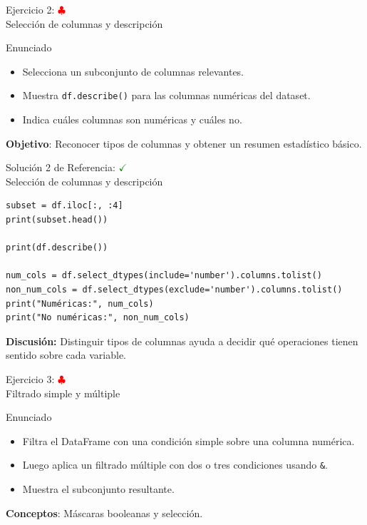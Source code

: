 \documentclass[10pt]{beamer}
\begin{document}
\begin{frame}{Ejercicio 2: \hfill \textcolor{red}{$\clubsuit$} \\ Selección de columnas y descripción}
  \begin{block}{Enunciado}
    \begin{itemize}
      \item Selecciona un subconjunto de columnas relevantes.
      \item Muestra \texttt{df.describe()} para las columnas numéricas del dataset.
      \item Indica cuáles columnas son numéricas y cuáles no.
    \end{itemize}
  \end{block}
  \textbf{Objetivo}: Reconocer tipos de columnas y obtener un resumen estadístico básico.
\end{frame}

\begin{solutionblock}
\begin{frame}[fragile]{Solución 2 de Referencia: \hfill \textcolor{green}{$\checkmark$} \\ Selección de columnas y descripción}
\begin{verbatim}
subset = df.iloc[:, :4]
print(subset.head())

print(df.describe())

num_cols = df.select_dtypes(include='number').columns.tolist()
non_num_cols = df.select_dtypes(exclude='number').columns.tolist()
print("Numéricas:", num_cols)
print("No numéricas:", non_num_cols)
\end{verbatim}
\textbf{Discusión:} Distinguir tipos de columnas ayuda a decidir qué operaciones tienen sentido sobre cada variable.
\end{frame}
\end{solutionblock}

\begin{frame}{Ejercicio 3: \hfill \textcolor{red}{$\clubsuit$} \\ Filtrado simple y múltiple}
  \begin{block}{Enunciado}
    \begin{itemize}
      \item Filtra el DataFrame con una condición simple sobre una columna numérica.
      \item Luego aplica un filtrado múltiple con dos o tres condiciones usando \texttt{\&}.
      \item Muestra el subconjunto resultante.
    \end{itemize}
  \end{block}
  \textbf{Conceptos}: Máscaras booleanas y selección.
\end{frame}
\end{document}
